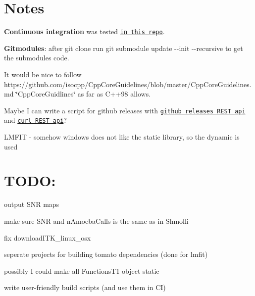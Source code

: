 \section*{Notes}


\begin{DoxyItemize}
\item {\bfseries Continuous integration} was tested \href{https://github.com/MRKonrad/ContinousIntegrationPlayground}{\tt in this repo}.
\item {\bfseries Gitmodules}\-: after {\ttfamily git clone} run {\ttfamily git submodule update -\/-\/init -\/-\/recursive} to get the submodules code.
\item It would be nice to follow https\-://github.com/isocpp/\-Cpp\-Core\-Guidelines/blob/master/\-Cpp\-Core\-Guidelines.\-md \char`\"{}\-Cpp\-Core\-Guidlines\char`\"{} as far as C++98 allows.
\item Maybe I can write a script for github releases with \href{https://developer.github.com/v3/repos/releases/#create-a-release}{\tt github releases R\-E\-S\-T api} and \href{http://www.codingpedia.org/ama/how-to-test-a-rest-api-from-command-line-with-curl/#12_HEAD_requests}{\tt curl R\-E\-S\-T api}?
\item L\-M\-F\-I\-T -\/ somehow windows does not like the static library, so the dynamic is used
\end{DoxyItemize}

\section*{T\-O\-D\-O\-:}


\begin{DoxyItemize}
\item output S\-N\-R maps
\item make sure S\-N\-R and n\-Amoeba\-Calls is the same as in Shmolli
\item fix download\-I\-T\-K\-\_\-linux\-\_\-osx
\item seperate projects for building tomato dependencies (done for lmfit)
\item possibly I could make all Functions\-T1 object static
\item write user-\/friendly build scripts (and use them in C\-I) 
\end{DoxyItemize}